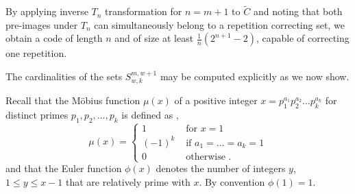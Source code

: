 By applying inverse $T_n$ transformation for $n=m+1$ to $\tilde{C}$
and noting that both pre-images under $T_n$ can simultaneously
belong to a repetition correcting set, we obtain a code of length
$n$ and of size at least $\frac{1}{n}
                           \left(2^{n+1}-2\right)$, capable of
                           correcting one repetition.



The cardinalities of the sets $S_{w,k}^{m,w+1}$ may be computed
explicitly as we now show.

Recall that the M\"{o}bius function $\mu(x)$ of a positive integer
$x=p_1^{a_1}p_2^{a_2}\dots p_k^{a_k}$ for distinct primes
$p_1,p_2,\dots,p_k$ is defined as \cite{apostol},
\begin{equation}
\mu(x)=\left\{ \begin{array}{lll} 1 &\text{ for }x=1\\
(-1)^k &\text{ if }a_1=\dots=a_k=1\\
0 &\text{ otherwise }.
\end{array}\right.
\end{equation}and that the Euler function $\phi(x)$ denotes the number of
integers $y$, $1 \leq y \leq x-1$ that are relatively prime with
$x$. By convention $\phi(1)=1$.

